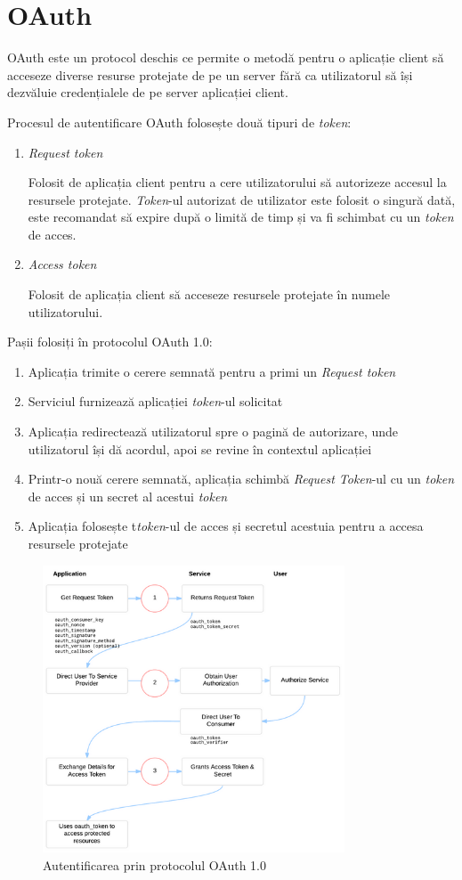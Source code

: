 \section{OAuth}
 OAuth este un protocol deschis ce permite o metodă pentru o aplicație  client să acceseze diverse resurse protejate de pe un server fără ca utilizatorul să își dezvăluie credențialele de pe server aplicației client.\cite{RFC5849}
 
 Procesul de autentificare OAuth folosește două tipuri de \textit{token}\cite{oauth-core-revision}:
 \begin{enumerate}
     \item \textit{Request token}
     
     Folosit de aplicația client pentru a cere utilizatorului să autorizeze accesul la resursele protejate. \textit{Token}-ul autorizat de utilizator este folosit o singură dată, este recomandat să expire după o limită de timp și va fi schimbat cu un \textit{token} de acces.
     \item \textit{Access token}
     
     Folosit de aplicația client să acceseze resursele protejate în numele utilizatorului. 
 \end{enumerate}{}
 
 Pașii folosiți în protocolul OAuth 1.0:
 \begin{enumerate}
     \item Aplicația trimite o cerere semnată pentru a primi un \textit{Request token}
     \item Serviciul furnizează aplicației \textit{token}-ul solicitat
     \item Aplicația redirectează utilizatorul spre o pagină de autorizare, unde utilizatorul își dă acordul, apoi se revine în contextul aplicației
     \item Printr-o nouă cerere semnată, aplicația schimbă \textit{Request Token}-ul cu un \textit{token} de acces și un secret al acestui \textit{token}
     \item Aplicația folosește t\textit{token}-ul de acces și secretul acestuia pentru a accesa resursele protejate
 \end{enumerate}{}
 
 
 \begin{figure}[!htbp]
    \begin{center}
        \includegraphics[width=0.8\textwidth]{images/oauth.png}
        \caption{Autentificarea prin protocolul OAuth 1.0\cite{oauth-bible}}
    \end{center}
\end{figure}

